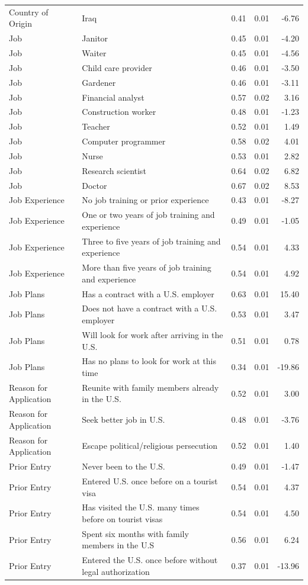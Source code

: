 \documentclass[a4paper,12pt]{article}\usepackage[]{graphicx}\usepackage[]{color}
\begin{document}
\begin{table}[ht]
\begin{tabular}{lp{3in}rrr}
  Country of Origin & Iraq & 0.41 & 0.01 & -6.76 \\ 
  Job & Janitor & 0.45 & 0.01 & -4.20 \\ 
  Job & Waiter & 0.45 & 0.01 & -4.56 \\ 
  Job & Child care provider & 0.46 & 0.01 & -3.50 \\ 
  Job & Gardener & 0.46 & 0.01 & -3.11 \\ 
  Job & Financial analyst & 0.57 & 0.02 & 3.16 \\ 
  Job & Construction worker & 0.48 & 0.01 & -1.23 \\ 
  Job & Teacher & 0.52 & 0.01 & 1.49 \\ 
  Job & Computer programmer & 0.58 & 0.02 & 4.01 \\ 
  Job & Nurse & 0.53 & 0.01 & 2.82 \\ 
  Job & Research scientist & 0.64 & 0.02 & 6.82 \\ 
  Job & Doctor & 0.67 & 0.02 & 8.53 \\ 
  Job Experience & No job training or prior experience & 0.43 & 0.01 & -8.27 \\ 
  Job Experience & One or two years of job training and experience & 0.49 & 0.01 & -1.05 \\ 
  Job Experience & Three to five years of job training and experience & 0.54 & 0.01 & 4.33 \\ 
  Job Experience & More than five years of job training and experience & 0.54 & 0.01 & 4.92 \\ 
  Job Plans & Has a contract with a U.S. employer & 0.63 & 0.01 & 15.40 \\ 
  Job Plans & Does not have a contract with a U.S. employer & 0.53 & 0.01 & 3.47 \\ 
  Job Plans & Will look for work after arriving in the U.S. & 0.51 & 0.01 & 0.78 \\ 
  Job Plans & Has no plans to look for work at this time & 0.34 & 0.01 & -19.86 \\ 
  Reason for Application & Reunite with family members already in the U.S. & 0.52 & 0.01 & 3.00 \\ 
  Reason for Application & Seek better job in U.S. & 0.48 & 0.01 & -3.76 \\ 
  Reason for Application & Escape political/religious persecution & 0.52 & 0.01 & 1.40 \\ 
  Prior Entry & Never been to the U.S. & 0.49 & 0.01 & -1.47 \\ 
  Prior Entry & Entered U.S. once before on a tourist visa & 0.54 & 0.01 & 4.37 \\ 
  Prior Entry & Has visited the U.S. many times before on tourist visas & 0.54 & 0.01 & 4.50 \\ 
  Prior Entry & Spent six months with family members in the U.S & 0.56 & 0.01 & 6.24 \\ 
  Prior Entry & Entered the U.S. once before without legal authorization & 0.37 & 0.01 & -13.96 \\ 
   \hline
\end{tabular}
\endgroup
\end{table}
\end{document}
